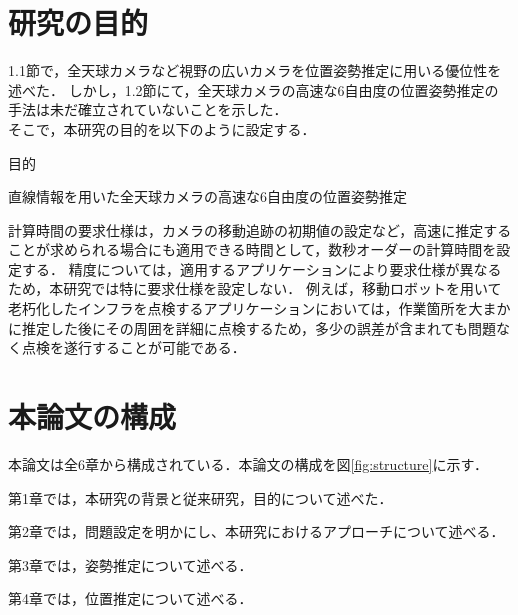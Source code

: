 \clearpage
\section{研究の目的}
\label{Objective}

1.1節で，全天球カメラなど視野の広いカメラを位置姿勢推定に用いる優位性を述べた．
しかし，1.2節にて，全天球カメラの高速な6自由度の位置姿勢推定の手法は未だ確立されていないことを示した．
\\

そこで，本研究の目的を以下のように設定する．

\vspace{5pt}
\begin{itembox}[c]{目的}
\begin{center}
直線情報を用いた全天球カメラの高速な6自由度の位置姿勢推定
\end{center}
\end{itembox}
\vspace{5pt}

計算時間の要求仕様は，カメラの移動追跡の初期値の設定など，高速に推定することが求められる場合にも適用できる時間として，数秒オーダーの計算時間を設定する．
精度については，適用するアプリケーションにより要求仕様が異なるため，本研究では特に要求仕様を設定しない．
例えば，移動ロボットを用いて老朽化したインフラを点検するアプリケーションにおいては，作業箇所を大まかに推定した後にその周囲を詳細に点検するため，多少の誤差が含まれても問題なく点検を遂行することが可能である．

\clearpage
\section{本論文の構成}
\label{Structure}

本論文は全6章から構成されている．本論文の構成を図\ref{fig:structure}に示す．

第1章では，本研究の背景と従来研究，目的について述べた．

第2章では，問題設定を明かにし、本研究におけるアプローチについて述べる．

第3章では，姿勢推定について述べる．

第4章では，位置推定について述べる．

